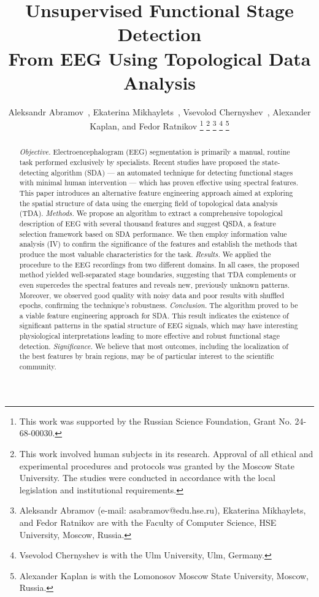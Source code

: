\documentclass[journal,twoside,web]{ieeecolor2}
\begin{document}
\title{Unsupervised Functional Stage Detection \\From EEG Using Topological Data Analysis}
\author{
  Aleksandr Abramov~, Ekaterina Mikhaylets~, Vsevolod Chernyshev~, Alexander Kaplan, and Fedor Ratnikov
  \thanks{This work was supported by the Russian Science Foundation, Grant No. 24-68-00030.}
  \thanks{This work involved human subjects in its research. Approval of all ethical and experimental procedures and protocols was granted by the Moscow State University. The studies were conducted in accordance with the local legislation and institutional requirements.}
  \thanks{Aleksandr Abramov (e-mail: asabramov@edu.hse.ru), Ekaterina Mikhaylets, and Fedor Ratnikov are with the Faculty of Computer Science, HSE University, Moscow, Russia.}
  \thanks{Vsevolod Chernyshev is with the Ulm University, Ulm, Germany.}
  \thanks{Alexander Kaplan is with the Lomonosov Moscow State University, Moscow, Russia.}
}

\maketitle

\begin{abstract}
\textit{Objective.}
Electroencephalogram (EEG) segmentation is primarily a manual, routine task performed exclusively by specialists. Recent studies have proposed the state-detecting algorithm (SDA) --- an automated technique for detecting functional stages with minimal human intervention --- which has proven effective using spectral features. This paper introduces an alternative feature engineering approach aimed at exploring the spatial structure of data using the emerging field of topological data analysis (TDA).
\textit{Methods.}
We propose an algorithm to extract a comprehensive topological description of EEG with several thousand features and suggest QSDA, a feature selection framework based on SDA performance. We then employ information value analysis (IV) to confirm the significance of the features and establish the methods that produce the most valuable characteristics for the task.
\textit{Results.}
We applied the procedure to the EEG recordings from two different domains. In all cases, the proposed method yielded well-separated stage boundaries, suggesting that TDA complements or even supercedes the spectral features and reveals new, previously unknown patterns. Moreover, we observed good quality with noisy data and poor results with shuffled epochs, confirming the technique's robustness. 
\textit{Conclusion.}
The algorithm proved to be a viable feature engineering approach for SDA. This result indicates the existence of significant patterns in the spatial structure of EEG signals, which may have interesting physiological interpretations leading to more effective and robust functional stage detection. 
\textit{Significance.}
We believe that most outcomes, including the localization of the best features by brain regions, may be of particular interest to the scientific community.
\end{abstract}
\end{document}
